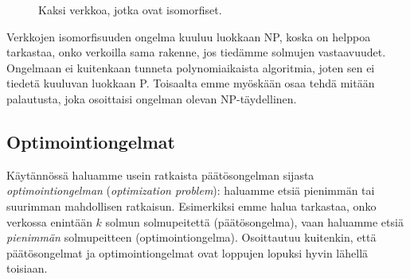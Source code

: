 \begin{figure}
\center
\begin{center}
\end{center}
\caption{Kaksi verkkoa, jotka ovat isomorfiset.}
\label{fig:veriso}
\end{figure}

Verkkojen isomorfisuuden ongelma kuuluu luokkaan NP,
koska on helppoa tarkastaa, onko verkoilla sama rakenne,
jos tiedämme solmujen vastaavuudet.
Ongelmaan ei kuitenkaan tunneta polynomiaikaista algoritmia,
joten sen ei tiedetä kuuluvan luokkaan P.
Toisaalta emme myöskään osaa tehdä mitään palautusta,
joka osoittaisi ongelman olevan NP-täydellinen.

\subsection{Optimointiongelmat}


Käytännössä haluamme usein ratkaista päätösongelman
sijasta \emph{optimointiongelman} (\emph{optimization problem}): haluamme etsiä pienimmän
tai suurimman mahdollisen ratkaisun.
Esimerkiksi emme halua tarkastaa, onko verkossa
enintään $k$ solmun solmupeitettä (päätösongelma),
vaan haluamme etsiä \emph{pienimmän} solmupeitteen (optimointiongelma).
Osoittautuu kuitenkin, että päätösongelmat ja optimointiongelmat
ovat loppujen lopuksi hyvin lähellä toisiaan.

